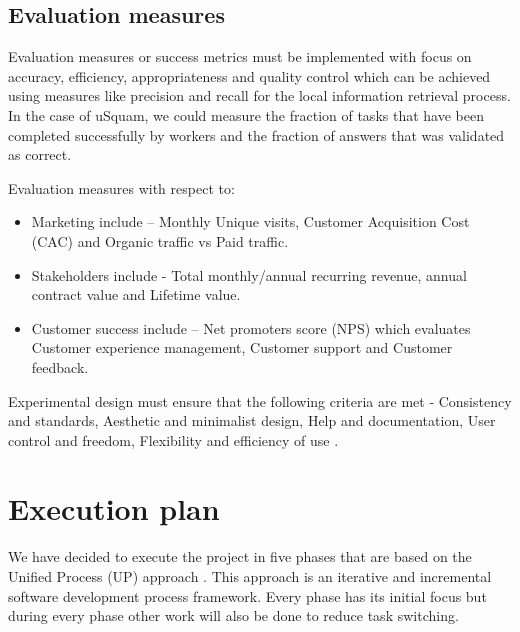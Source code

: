 \documentclass[a4paper,dutch,fleqn]{exam}
\begin{document}
\subsection{Evaluation measures}
Evaluation measures or success metrics must be implemented with focus on accuracy, efficiency, appropriateness and quality control which can be achieved using measures like precision and recall for the local information retrieval process. In the case of uSquam, we could measure the fraction of tasks that have been completed successfully by workers and the fraction of answers that was validated as correct.

Evaluation measures with respect to:
\begin{itemize}
\itemsep0em 
\item Marketing include – Monthly Unique visits, Customer Acquisition Cost (CAC) and Organic traffic vs Paid traffic.
\item Stakeholders include - Total monthly/annual recurring revenue, annual contract value and Lifetime value.
\item Customer success include – Net promoters score (NPS) which evaluates Customer experience management, Customer support and Customer feedback.
\end{itemize}
 
Experimental design must ensure that the following criteria are met - Consistency and standards, Aesthetic and minimalist design, Help and documentation, User control and freedom, Flexibility and efficiency of use \cite{heuristics}.

\section{Execution plan}
We have decided to execute the project in five phases that are based on the Unified Process (UP) approach \cite{jacobson1999unified}. This approach is an iterative and incremental software development process framework. Every phase has its initial focus but during every phase other work will also be done to reduce task switching. 
\end{document}
